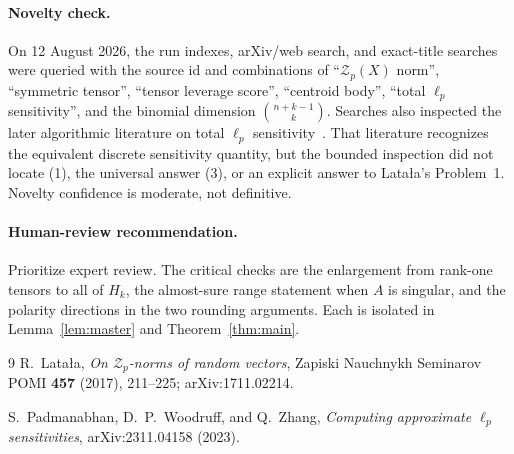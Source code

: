 \documentclass[10pt]{article}
\begin{document}
\paragraph{Novelty check.}
On 12 August 2026, the run indexes, arXiv/web search, and exact-title searches
were queried with the source id and combinations of ``$\mathcal Z_p(X)$
norm'', ``symmetric tensor'', ``tensor leverage score'', ``centroid body'',
``total $\ell_p$ sensitivity'', and the binomial dimension
$\binom{n+k-1}{k}$.  Searches also inspected the later algorithmic literature
on total $\ell_p$ sensitivity~\cite{sensitivity}.  That literature recognizes
the equivalent discrete sensitivity quantity, but the bounded inspection did
not locate (1), the universal answer (3), or an explicit answer to Lata\l a's
Problem~1.  Novelty confidence is moderate, not definitive.

\paragraph{Human-review recommendation.}
Prioritize expert review.  The critical checks are the enlargement from
rank-one tensors to all of $H_k$, the almost-sure range statement when $A$ is
singular, and the polarity directions in the two rounding arguments.  Each is
isolated in Lemma~\ref{lem:master} and Theorem~\ref{thm:main}.

\begin{thebibliography}{9}
R.~Lata\l a, \emph{On $\mathcal Z_p$-norms of random vectors},
Zapiski Nauchnykh Seminarov POMI \textbf{457} (2017), 211--225;
arXiv:1711.02214.

S.~Padmanabhan, D.~P.~Woodruff, and Q.~Zhang,
\emph{Computing approximate $\ell_p$ sensitivities}, arXiv:2311.04158 (2023).
\end{thebibliography}
\end{document}
